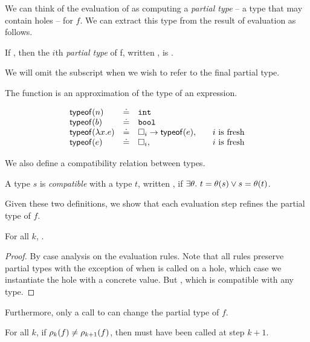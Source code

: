 We can think of the evaluation of  as computing a
\emph{partial type} -- a type that may contain holes -- for $f$.
%
We can extract this type from the result of evaluation as follows.
%
\begin{defn}
\label{defn:partial-type}
  If , then the $i$th
  \emph{partial type} of f, written ,
  is .

  We will omit the subscript when we wish to refer to the final partial
  type.
\end{defn}
%
The \typeof{} function is an approximation of the type of an expression.
\begin{defn}
\label{def:typeof}
  \[
  \begin{array}{lcll}
    \mathsf{typeof}(n)   & \doteq & \mathtt{int} & \\
    \mathsf{typeof}(b)   & \doteq & \mathtt{bool} & \\
    \mathsf{typeof}(\lambda x. e) & \doteq & {\square_{i}} \rightarrow \mathsf{typeof}(e), & \quad \text{$i$ is fresh} \\
    \mathsf{typeof}(e) & \doteq & \square_{i}, & \quad \text{$i$ is fresh} \\
  \end{array}
  \]
\end{defn}
%
We also define a compatibility relation between types.
%
\begin{defn}
\label{defn:type-compat}
  A type $s$ is \emph{compatible} with a type $t$, written , if
  $\exists \theta.\ t = \theta(s) \lor s = \theta(t)$.
\end{defn}
%
Given these two definitions, we show that each evaluation step
refines the partial type of $f$.
%
\begin{lem}
\label{lem:refine-partial}
  For all $k$, .
\end{lem}
\begin{proof}
  By case analysis on the evaluation rules.
  Note that all rules preserve partial types with the exception of when
  \forcesym is called on a hole, which case we instantiate the hole with
  a concrete value.
  But \hastype{\ehole{}}{\thole{}}, which is compatible with any type.
\end{proof}
%
Furthermore, only a call to \forcesym can change the partial type of $f$.
%
\begin{lem}
\label{lem:force-inst}
  For all $k$, if $\rho_{k}(f) \neq \rho_{k+1}(f)$, then \forcesym must
  have been called at step $k+1$.
\end{lem}
